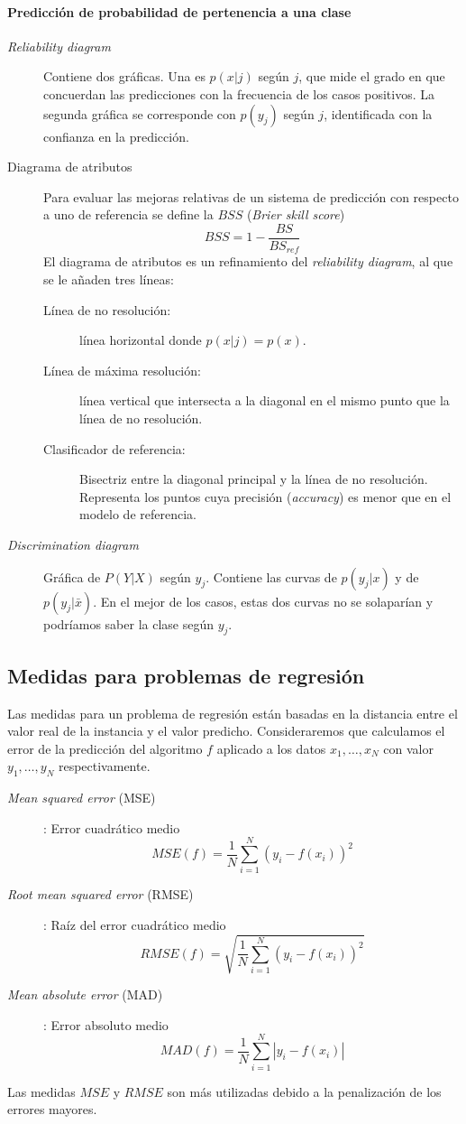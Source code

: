 \paragraph{Predicción de probabilidad de pertenencia a una clase} 	
	\begin{description}
		\item[\textit{Reliability diagram}] Contiene dos gráficas. Una es $p(x|j)$ según $j$, que mide el grado en que concuerdan las predicciones con la frecuencia de los casos positivos. La segunda gráfica se corresponde con $p(y_j)$ según $j$, identificada con la confianza en la predicción.
		\item[Diagrama de atributos] Para evaluar las mejoras relativas de un sistema de predicción con respecto a uno de referencia se define la $BSS$ (\textit{Brier skill score})
			\[BSS = 1 - \frac{BS}{BS_{ref}} \]
			El diagrama de atributos es un refinamiento del \textit{reliability diagram}, al que se le añaden tres líneas: 
			\begin{description}
			\item[Línea de no resolución:] línea horizontal donde $p(x|j)=p(x)$.
			\item[Línea de máxima resolución:] línea vertical que intersecta a la diagonal en el mismo punto que la línea de no resolución.
			\item[Clasificador de referencia:] Bisectriz entre la diagonal principal y la línea de no resolución. Representa los puntos cuya precisión (\textit{accuracy}) es menor que en el modelo de referencia.
			\end{description}
		\item[\textit{Discrimination diagram}] Gráfica de $P(Y|X)$ según $y_j$. Contiene las curvas de $p(y_j|x)$ y de $p(y_j|\bar{x})$. En el mejor de los casos, estas dos curvas no se solaparían y podríamos saber la clase según $y_j$.
	\end{description}
	
	
\subsection*{Medidas para problemas de regresión}

	Las medidas para un problema de regresión están basadas en la distancia entre el valor real de la instancia y el valor predicho. Consideraremos que calculamos el error de la predicción del algoritmo $f$ aplicado a los datos $x_1, \dots, x_N$ con valor $y_1, \dots, y_N$ respectivamente.
	
\begin{description}
	\item[\textit{Mean squared error} (MSE)]: Error cuadrático medio
		\[ MSE(f) = \frac{1}{N} \sum\limits_{i=1}^N
								(y_i - f(x_i))^2	\]
	\item[\textit{Root mean squared error} (RMSE)]: Raíz del error cuadrático medio
		\[ RMSE(f) = \sqrt{\frac{1}{N} \sum\limits_{i=1}^N (y_i - f(x_i))^2}	\]
		
	\item[\textit{Mean absolute error} (MAD) ]: Error absoluto medio
		\[ MAD(f) = \frac{1}{N} \sum\limits_{i=1}^N
								|y_i - f(x_i)|	\]
\end{description}

	Las medidas $MSE$ y $RMSE$ son más utilizadas debido a la penalización de los errores mayores. 